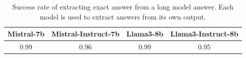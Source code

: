 \begin{table}[t]
    \centering
    \caption{Success rate of extracting exact answer from a long model answer. Each model is used to extract answers from its own output.}
    \begin{tabular}{cccc}
    \toprule
       Mistral-7b & Mistral-Instruct-7b & Llama3-8b & Llama3-Instruct-8b \\
       \midrule 
       0.99 & 0.96 & 0.99 & 0.95 \\
    \bottomrule
    \end{tabular}
    \label{tab:extract_exact_answer}
\end{table}